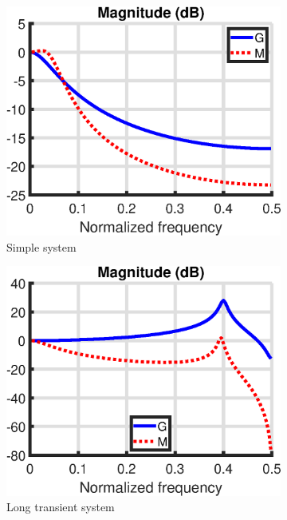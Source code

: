 \begin{figure}[H]
\centering
\begin{subfigure}{.33\textwidth}
	\includegraphics[width=\linewidth]{figures/G_and_M_simple.eps}
	\caption{Simple system}
\end{subfigure}%
\begin{subfigure}{.33\textwidth}
	\includegraphics[width=\linewidth]{figures/G_and_M_long_transient.eps}
	\caption{Long transient system}
\end{subfigure}%
\begin{subfigure}{.33\textwidth}

\end{subfigure}
\end{figure}
